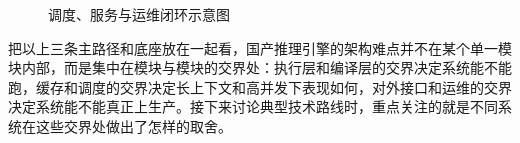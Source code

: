 \begin{figure}[!htb]
\centering
\resizebox{0.92\linewidth}{!}{}
\caption{调度、服务与运维闭环示意图}
\label{fig:service-ops-closure}
\end{figure}

把以上三条主路径和底座放在一起看，国产推理引擎的架构难点并不在某个单一模块内部，而是集中在模块与模块的交界处：执行层和编译层的交界决定系统能不能跑，缓存和调度的交界决定长上下文和高并发下表现如何，对外接口和运维的交界决定系统能不能真正上生产。接下来讨论典型技术路线时，重点关注的就是不同系统在这些交界处做出了怎样的取舍。
